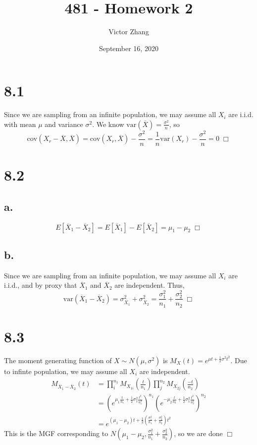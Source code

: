 \documentclass{article}
\title{481 - Homework 2}
\author{Victor Zhang}
\date{September 16, 2020}
\newcommand{\var}{\mathrm{var}}
\newcommand{\cov}{\mathrm{cov}}
\begin{document}
\maketitle

\section*{8.1}
Since we are sampling from an infinite population, we may assume all $X_i$ are i.i.d. with mean $\mu$ and variance $\sigma^2$. We know $\var(\overline{X}) = \frac{\sigma^2}{n}$, so
$$\cov(X_r-\overline{X}, \overline{X}) = \cov(X_r, \overline{X}) - \frac{\sigma^2}{n} = \frac{1}{n}\var(X_r) - \frac{\sigma^2}{n} = 0 \; \Box$$

\section*{8.2}
\subsection*{a.}
$$E[\overline{X}_1 - \overline{X}_2] = E[\overline{X}_1] - E[\overline{X}_2] = \mu_1 - \mu_2 \; \Box$$

\subsection*{b.}
Since we are sampling from an infinite population, we may assume all $X_i$ are i.i.d., and by proxy that $\overline{X}_1$ and $\overline{X}_2$ are independent. Thus,
$$\var(\overline{X}_1 - \overline{X}_2) = \sigma^2_{\overline{X}_1} + \sigma^2_{\overline{X}_2} = \frac{\sigma^2_1}{n_1} + \frac{\sigma^2_2}{n_2} \; \Box $$

\section*{8.3}
The moment generating function of $X \sim N(\mu, \sigma^2)$ is $M_X(t) = e^{\mu t + \frac{1}{2}\sigma^2t^2}$. Due to infinte population, we may assume all $X_i$ are independent.
\begin{equation*}
\begin{split}
  M_{\overline{X}_1 - \overline{X}_2}(t) &= \prod\limits_i^{n_1} M_{X_{1i}}(\frac{t}{n_1})\prod\limits_j^{n_2} M_{X_{2j}}(\frac{-t}{n_2})\\
  &= \left( e^{\mu_1\frac{t}{n_1} + \frac{1}{2}\sigma^2_1\frac{t^2}{n^2_1}} \right)^{n_1}\left( e^{-\mu_2\frac{t}{n_2} + \frac{1}{2}\sigma^2_1\frac{t^2}{n^2_2}} \right)^{n_2}\\
  &= e^{(\mu_1-\mu_2)t + \frac{1}{2}(\frac{\sigma^2_1}{n_1} + \frac{\sigma^2_2}{n_2})t^2}
\end{split}
\end{equation*}
This is the MGF corresponding to $N(\mu_1 - \mu_2, \frac{\sigma^2_1}{n_1} + \frac{\sigma^2_2}{n_2})$, so we are done $\Box$
\end{document}
